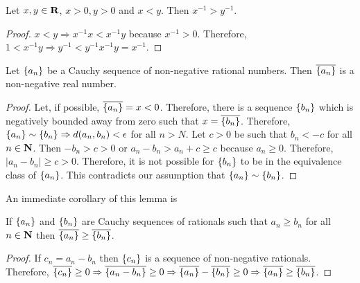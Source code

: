 \begin{lem}\label{c4s4l5}
Let $x, y \in \mathbf{R}$, $x > 0, y > 0$ and $x < y$. Then $x^{-1} > 
y^{-1}$.
\end{lem}
\begin{proof}
$x < y \Rightarrow x^{-1}x < x^{-1}y$ because $x^{-1} > 0$. Therefore,
$1 < x^{-1}y \Rightarrow y^{-1} < y^{-1}x^{-1}y = x^{-1}$.
\end{proof}

\begin{lem}\label{c4s4l6}
Let $\{a_n\}$ be a Cauchy sequence of non-negative rational numbers.
Then $\overline{\{a_n\}}$ is a non-negative real number.
\end{lem}
\begin{proof}
Let, if possible, $\overline{\{a_n\}} = x < 0$. Therefore, there is a
sequence $\{b_n\}$ which is negatively bounded away from zero such that
$x = \overline{\{b_n\}}$. Therefore, $\{a_n\} \sim \{b_n\} 
\Rightarrow d(a_n, b_n) < \epsilon$ for all $n > N$. Let $c > 0$ be 
such that $b_n < -c$ for all $n \in \mathbf{N}$. Then $-b_n > c > 0$ or $a_n
- b_n > a_n + c \ge c$ because $a_n \ge 0$. Therefore, $|a_n - b_n| \ge c
> 0$. Therefore, it is not possible for $\{b_n\}$ to be in the 
equivalence class of $\{a_n\}$. This contradicts our assumption that
$\{a_n\} \sim \{b_n\}$.
\end{proof}

An immediate corollary of this lemma is
\begin{cor}
If $\{a_n\}$ and $\{b_n\}$ are Cauchy sequences of rationals such
that $a_n \ge b_n$ for all $n \in \mathbf{N}$ then $\overline{\{a_n\}} \ge
\overline{\{b_n\}}$.
\end{cor}
\begin{proof}
If $c_n = a_n - b_n$ then $\{c_n\}$ is a sequence of non-negative
rationals. Therefore, $\overline{\{c_n\}} \ge 0 \Rightarrow \overline{
\{a_n - b_n\}} \ge 0 \Rightarrow \overline{\{a_n\}} - \overline{\{
b_n\}} \ge 0 \Rightarrow \overline{\{a_n\}} \ge \overline{\{b_n\}}$.
\end{proof}

